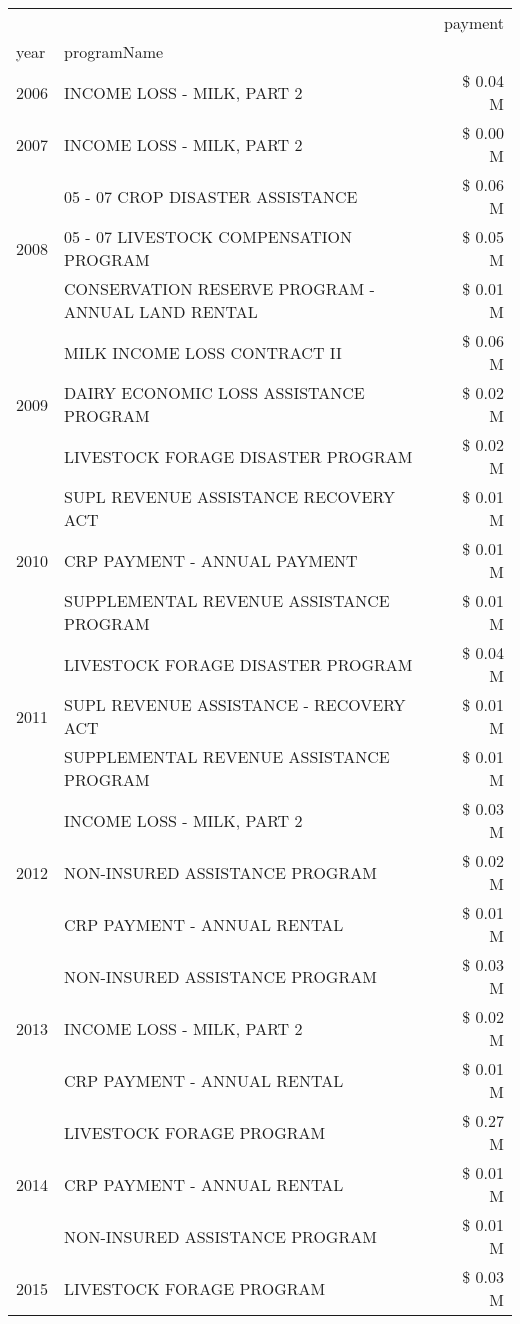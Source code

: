 \begin{tabular}{llr}
\toprule
 &  & payment \\
year & programName &  \\
\midrule
2006 & INCOME LOSS - MILK, PART 2 & \$ 0.04 M \\
\cline{1-3}
2007 & INCOME LOSS - MILK, PART 2 & \$ 0.00 M \\
\cline{1-3}
\multirow[t]{3}{*}{2008} & 05 - 07 CROP DISASTER ASSISTANCE & \$ 0.06 M \\
 & 05 - 07 LIVESTOCK COMPENSATION PROGRAM & \$ 0.05 M \\
 & CONSERVATION RESERVE PROGRAM - ANNUAL LAND RENTAL & \$ 0.01 M \\
\cline{1-3}
\multirow[t]{3}{*}{2009} & MILK INCOME LOSS CONTRACT II & \$ 0.06 M \\
 & DAIRY ECONOMIC LOSS ASSISTANCE PROGRAM & \$ 0.02 M \\
 & LIVESTOCK FORAGE DISASTER  PROGRAM & \$ 0.02 M \\
\cline{1-3}
\multirow[t]{3}{*}{2010} & SUPL REVENUE ASSISTANCE RECOVERY ACT & \$ 0.01 M \\
 & CRP PAYMENT - ANNUAL PAYMENT & \$ 0.01 M \\
 & SUPPLEMENTAL REVENUE ASSISTANCE PROGRAM & \$ 0.01 M \\
\cline{1-3}
\multirow[t]{3}{*}{2011} & LIVESTOCK FORAGE DISASTER PROGRAM & \$ 0.04 M \\
 & SUPL REVENUE ASSISTANCE - RECOVERY ACT & \$ 0.01 M \\
 & SUPPLEMENTAL REVENUE ASSISTANCE PROGRAM & \$ 0.01 M \\
\cline{1-3}
\multirow[t]{3}{*}{2012} & INCOME LOSS - MILK, PART 2 & \$ 0.03 M \\
 & NON-INSURED ASSISTANCE PROGRAM & \$ 0.02 M \\
 & CRP PAYMENT - ANNUAL RENTAL & \$ 0.01 M \\
\cline{1-3}
\multirow[t]{3}{*}{2013} & NON-INSURED ASSISTANCE PROGRAM & \$ 0.03 M \\
 & INCOME LOSS - MILK, PART 2 & \$ 0.02 M \\
 & CRP PAYMENT - ANNUAL RENTAL & \$ 0.01 M \\
\cline{1-3}
\multirow[t]{3}{*}{2014} & LIVESTOCK FORAGE PROGRAM & \$ 0.27 M \\
 & CRP PAYMENT - ANNUAL RENTAL & \$ 0.01 M \\
 & NON-INSURED ASSISTANCE PROGRAM & \$ 0.01 M \\
\cline{1-3}
\multirow[t]{3}{*}{2015} & LIVESTOCK FORAGE PROGRAM & \$ 0.03 M \\

\end{tabular}
